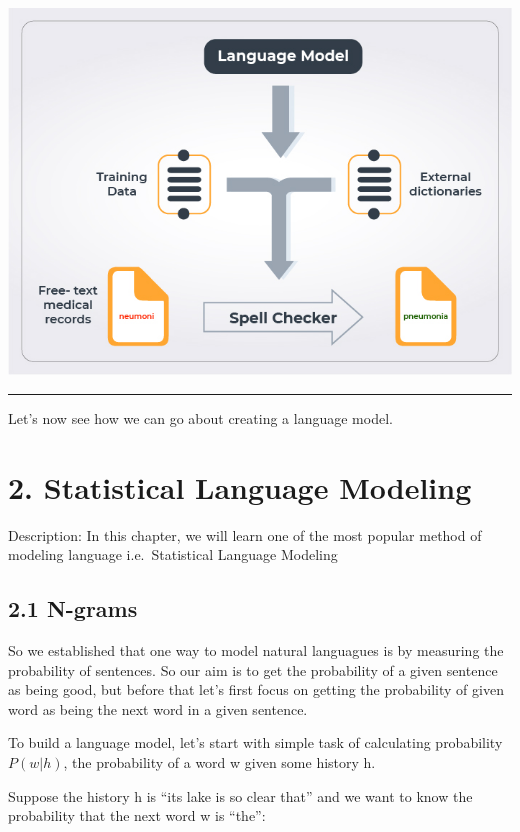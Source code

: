 \documentclass[11pt]{article}
\makeatletter
\def\maxwidth{\ifdim\Gin@nat@width>\linewidth\linewidth
    \else\Gin@nat@width\fi}
\let\Oldincludegraphics\includegraphics
\renewcommand{\includegraphics}[1]{\Oldincludegraphics[width=.8\maxwidth]{#1}}
\makeatother
\begin{document}
\includegraphics{lm.jpg}

\begin{center}\rule{0.5\linewidth}{\linethickness}\end{center}

Let's now see how we can go about creating a language model.

    \hypertarget{statistical-language-modeling}{%
\section{2. Statistical Language
Modeling}\label{statistical-language-modeling}}

Description: In this chapter, we will learn one of the most popular
method of modeling language i.e.~Statistical Language Modeling

    \hypertarget{n-grams}{%
\subsection{2.1 N-grams}\label{n-grams}}

    So we established that one way to model natural languagues is by
measuring the probability of sentences. So our aim is to get the
probability of a given sentence as being good, but before that let's
first focus on getting the probability of given word as being the next
word in a given sentence.

To build a language model, let's start with simple task of calculating
probability \(P(w|h)\), the probability of a word w given some history
h.

Suppose the history h is ``its lake is so clear that'' and we want to
know the probability that the next word w is ``the'':
\end{document}
